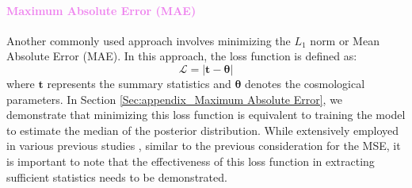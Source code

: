 \documentclass{aa}
\begin{document}
\paragraph{\textcolor{violet}{Maximum Absolute Error (MAE)}}
Another commonly used approach involves minimizing the $L_1$ norm or Mean Absolute Error (MAE). In this approach, the loss function is defined as:
\begin{equation}
    \mathcal{L}=|\bm{t}-\bm{\theta}|
\end{equation}
where $\bm{t}$ represents the summary statistics and $\bm{\theta}$ denotes the cosmological parameters.
In Section \ref{Sec:appendix_Maximum Absolute Error}, we demonstrate that minimizing this loss function is equivalent to training the model to estimate the median of the posterior distribution. While extensively employed in various previous studies \citep{2018PhRvD..97j3515G, fluri2018cosmological, ribli2019weak}, similar to the previous consideration for the MSE, it is important to note that the effectiveness of this loss function in extracting sufficient statistics needs to be demonstrated.
\end{document}
